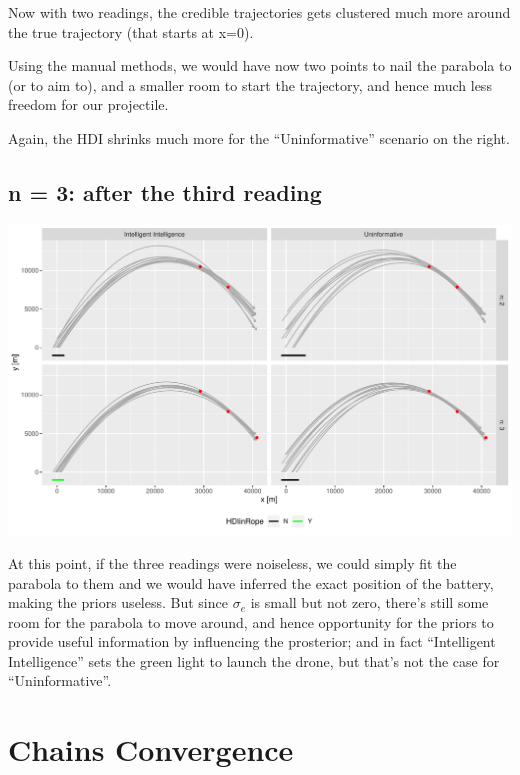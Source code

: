 \documentclass[]{article}
\begin{document}
Now with two readings, the credible trajectories gets clustered much
more around the true trajectory (that starts at x=0).

Using the manual methods, we would have now two points to nail the
parabola to (or to aim to), and a smaller room to start the trajectory,
and hence much less freedom for our projectile.

Again, the HDI shrinks much more for the ``Uninformative'' scenario on
the right.

\hypertarget{n-3-after-the-third-reading}{%
\subsection{n = 3: after the third
reading}\label{n-3-after-the-third-reading}}

\begin{center}\includegraphics[width=1.0\textwidth]{bayesian_artillery_files/figure-latex/plot_3-1} \end{center}

At this point, if the three readings were noiseless, we could simply fit
the parabola to them and we would have inferred the exact position of
the battery, making the priors useless. But since \(\sigma_e\) is small
but not zero, there's still some room for the parabola to move around,
and hence opportunity for the priors to provide useful information by
influencing the prosterior; and in fact ``Intelligent Intelligence''
sets the green light to launch the drone, but that's not the case for
``Uninformative''.

\hypertarget{chains-convergence}{%
\section{Chains Convergence}\label{chains-convergence}}
\end{document}
